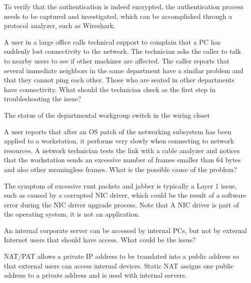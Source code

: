 \begin{solution}
To verify that the authentication is indeed encrypted, the authentication process needs to be captured and investigated, which can be accomplished through a protocol analyzer, such as Wireshark. 
\end{solution}

\begin{example}
A user in a large office calls technical support to complain that a PC has suddenly lost connectivity to the network. The technician asks the caller to talk to nearby users to see if other machines are affected. The caller reports that several immediate neighbors in the same department have a similar problem and that they cannot ping each other. Those who are seated in other departments have connectivity. What should the technician check as the first step in troubleshooting the issue?
\end{example}

\begin{solution}
The status of the departmental workgroup switch in the wiring closet
\end{solution}

\begin{example}
A user reports that after an OS patch of the networking subsystem has been applied to a workstation, it performs very slowly when connecting to network resources. A network technician tests the link with a cable analyzer and notices that the workstation sends an excessive number of frames smaller than 64 bytes and also other meaningless frames. What is the possible cause of the problem?
\end{example}

\begin{solution}
The symptom of excessive runt packets and jabber is typically a Layer 1 issue, such as caused by a corrupted NIC driver, which could be the result of a software error during the NIC driver upgrade process. Note that  A NIC driver is part of the operating system, it is not an application.
\end{solution}

\begin{example}
An internal corporate server can be accessed by internal PCs, but not by external Internet users that should have access. What could be the issue?
\end{example}

\begin{solution}
NAT/PAT allows a private IP address to be translated into a public address so that external users can access internal devices. Static NAT assigns one public address to a private address and is used with internal servers.
\end{solution}
